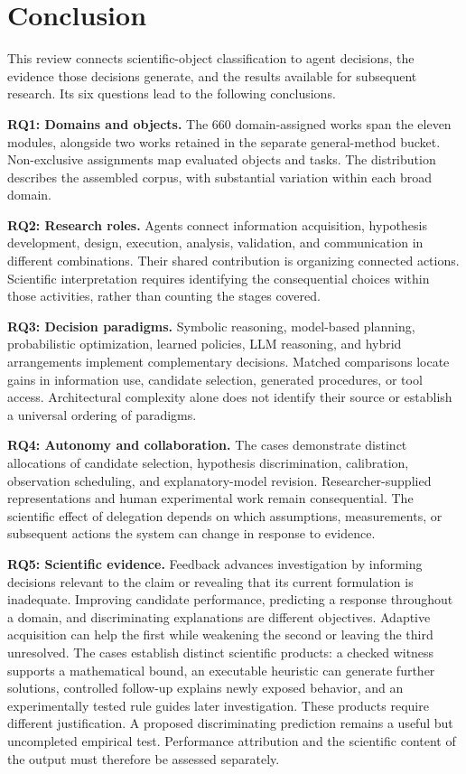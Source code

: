 \section{Conclusion}
\label{sec:conclusion}

This review connects scientific-object classification to agent decisions, the evidence those decisions generate, and the results available for subsequent research. Its six questions lead to the following conclusions.

\textbf{RQ1: Domains and objects.} The 660 domain-assigned works span the eleven modules, alongside two works retained in the separate general-method bucket. Non-exclusive assignments map evaluated objects and tasks. The distribution describes the assembled corpus, with substantial variation within each broad domain.

\textbf{RQ2: Research roles.} Agents connect information acquisition, hypothesis development, design, execution, analysis, validation, and communication in different combinations. Their shared contribution is organizing connected actions. Scientific interpretation requires identifying the consequential choices within those activities, rather than counting the stages covered.

\textbf{RQ3: Decision paradigms.} Symbolic reasoning, model-based planning, probabilistic optimization, learned policies, LLM reasoning, and hybrid arrangements implement complementary decisions. Matched comparisons locate gains in information use, candidate selection, generated procedures, or tool access. Architectural complexity alone does not identify their source or establish a universal ordering of paradigms.

\textbf{RQ4: Autonomy and collaboration.} The cases demonstrate distinct allocations of candidate selection, hypothesis discrimination, calibration, observation scheduling, and explanatory-model revision. Researcher-supplied representations and human experimental work remain consequential. The scientific effect of delegation depends on which assumptions, measurements, or subsequent actions the system can change in response to evidence.

\textbf{RQ5: Scientific evidence.} Feedback advances investigation by informing decisions relevant to the claim or revealing that its current formulation is inadequate. Improving candidate performance, predicting a response throughout a domain, and discriminating explanations are different objectives. Adaptive acquisition can help the first while weakening the second or leaving the third unresolved. The cases establish distinct scientific products: a checked witness supports a mathematical bound, an executable heuristic can generate further solutions, controlled follow-up explains newly exposed behavior, and an experimentally tested rule guides later investigation. These products require different justification. A proposed discriminating prediction remains a useful but uncompleted empirical test. Performance attribution and the scientific content of the output must therefore be assessed separately.


